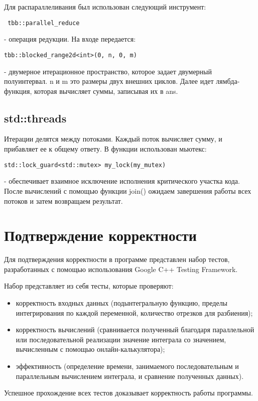 \documentclass{report}
\begin{document}
Для распараллеливания был использован следующий инструмент:
\par\verb| tbb::parallel_reduce| 
\par- операция редукции. На входе передается: \par\verb|tbb::blocked_range2d<int>(0, n, 0, m)| 
\par- двумерное итерационное пространство, которое задает двумерный полуинтервал. n и m это размеры двух внешних циклов. Далее идет лямбда-функция, которая вычисляет суммы, записывая их в ans. 
\subsection*{std::threads}
Итерации делятся между потоками. Каждый поток вычисляет сумму, и прибавляет ее к общему ответу. В функции использован мьютекс: \par\verb|std::lock_guard<std::mutex> my_lock(my_mutex)| 
\par - обеспечивает взаимное исключение исполнения критического участка кода. После вычислений с помощью функции join() ожидаем завершения работы всех потоков и затем возвращаем результат.
\newpage

\section*{Подтверждение корректности}
Для подтверждения корректности в программе представлен набор тестов, разработанных с помощью использования Google C++ Testing Framework.
\par Набор представляет из себя тесты, которые проверяют:
\begin{itemize}
\item корректность входных данных (подынтегральную функцию, пределы интегрирования по каждой переменной, количество отрезков для разбиения);
\item корректность вычислений (сравнивается полученный благодаря параллельной или последовательной реализации значение интеграла со значением, вычисленным с помощью онлайн-калькулятора);
\item эффективность (определение времени, занимаемого последовательным и параллельным вычислением интеграла, и сравнение полученных данных).
\end{itemize}
\par Успешное прохождение всех тестов доказывает корректность работы программы.
\newpage
\end{document}

